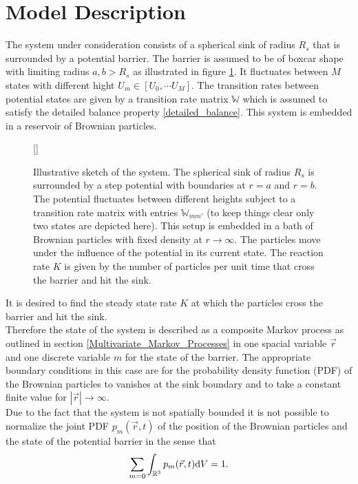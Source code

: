 \section{Model Description}
\label{Model_Description}
The system under consideration consists of a spherical sink of radius $R_s$ that is surrounded by a potential barrier. The barrier is assumed to be of boxcar shape with limiting radius $a,b>R_s$ as illustrated in figure \ref{skizze}. It fluctuates between $M$ states with different hight $U_m \in [U_0, \cdots U_M]$. The transition rates between potential states are given by a transition rate matrix $\mathbb{W}$ which is assumed to satisfy the detailed balance property \eqref{detailed_balance}. This system is embedded in a reservoir of Brownian particles.
\begin{figure}[H][\FBwidth]
    {\caption{Illustrative sketch of the system. The spherical sink of radius $R_s$ is surrounded by a step potential with boundaries at $r=a$ and $r=b$. The potential fluctuates between different heights subject to a transition rate matrix with entries $\mathbb{W}_{mm'}$ (to keep things clear only two states are depicted here). This setup is embedded in a bath of Brownian particles with fixed density at $r \rightarrow \infty$. The particles move under the influence of the potential in its current state. The reaction rate $K$ is given by the number of particles per unit time that cross the barrier and hit the sink.}\label{skizze}}
    {}
\end{figure}
It is desired to find the steady state rate $K$ at which the particles cross the barrier and hit the sink.\\
Therefore the state of the system is described as a composite Markov process as outlined in section \ref{Multivariate_Markov_Processes} in one spacial variable $\vec{r}$ and one discrete variable $m$ for the state of the barrier.
The appropriate boundary conditions in this case are for the probability density function (PDF) of the Brownian particles to vanishes at the sink boundary and to take a constant finite value for $|\vec{r}| \rightarrow \infty$. \\
Due to the fact that the system is not spatially bounded it is not possible to normalize the joint PDF $p_m(\vec{r},t)$ of the position of the Brownian particles and the state of the potential barrier in the sense that 
\begin{equation}
    \sum_{m=0} \int_{\mathbb{R}^{3}} p_m(\vec{r},t) {\rm d}V = 1.
    \label{pdfNormalization}
\end{equation}
